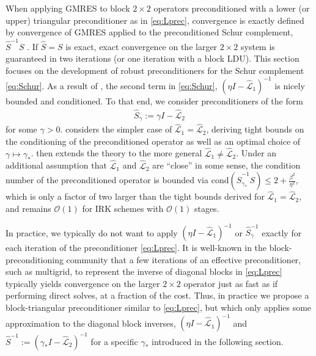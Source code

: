 \documentclass[review]{siamart}
\begin{document}
When applying GMRES to block $2\times 2$ operators preconditioned with a lower
(or upper) triangular preconditioner as in \eqref{eq:Lprec}, convergence
is exactly defined by convergence of GMRES applied to the preconditioned Schur
complement, $\widehat{S}^{-1}S$ \cite{2x2block}. If $\widehat{S} = S$ is exact,
exact convergence on the larger $2\times2$ system is guaranteed in two iterations
(or one iteration with a block LDU). This section focuses on the development of
robust preconditioners for the Schur complement \eqref{eq:Schur}. As a result of
, the second term in \eqref{eq:Schur},
$(\eta I - \widehat{\mathcal{L}}_1)^{-1}$ is nicely bounded and conditioned.
To that end, we consider preconditioners of the form
%
\begin{align*}
\widehat{S}_\gamma := \gamma I - \widehat{\mathcal{L}}_2
\end{align*}
%
for some $\gamma > 0$.  considers the simpler case
of $\widehat{\mathcal{L}}_1 = \widehat{\mathcal{L}}_2$, deriving tight bounds
on the conditioning of the preconditioned operator as well as an optimal choice
of $\gamma\mapsto\gamma_*$.  then extends the theory to
the more general $\widehat{\mathcal{L}}_1 \neq \widehat{\mathcal{L}}_2$.
Under an additional assumption that $\widehat{\mathcal{L}}_1$ and
$\widehat{\mathcal{L}}_2$ are ``close'' in some sense, the condition number
of the preconditioned operator is bounded via cond$(\widehat{S}_{\gamma_*}^{-1}S)
\leq 2 + \tfrac{\beta^2}{\eta^2}$, which is only a factor of two larger than
the tight bounds derived for $\widehat{\mathcal{L}}_1 = \widehat{\mathcal{L}}_2$,
and remains $\mathcal{O}(1)$ for IRK schemes with $\mathcal{O}(1)$ stages.


In practice, we typically do not want to apply $(\eta I - \widehat{\mathcal{L}}_1)^{-1}$
or $\widehat{S}_\gamma^{-1}$ exactly for each iteration of the preconditioner
\eqref{eq:Lprec}. It is well-known in the block-preconditioning community
that a few iterations of an effective preconditioner, such as multigrid,
to represent the inverse of diagonal blocks in \eqref{eq:Lprec} typically
yields convergence on the larger $2\times 2$ operator just as fast as if
performing direct solves, at a fraction of the cost. Thus, in practice we
propose a block-triangular preconditioner similar to \eqref{eq:Lprec}, but
which only applies some approximation to the diagonal block inverses,
$(\eta I - \widehat{\mathcal{L}}_1)^{-1}$ and
$\widehat{S}^{-1} := (\gamma_* I - \widehat{\mathcal{L}}_2)^{-1}$ for a
specific $\gamma_*$ introduced in the following section.
\end{document}
